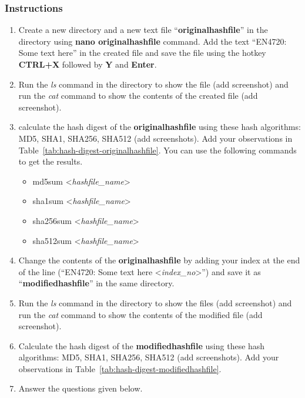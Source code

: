 \documentclass[11pt,letterpaper]{article}
\begin{document}
	\subsubsection*{Instructions}
	\begin{enumerate}
		\item Create a new directory and a new text file ``\textbf{originalhashfile}'' in the directory using \textbf{nano originalhashfile} command. Add the text ``EN4720: Some text here'' in the created file and save the file using the hotkey \textbf{CTRL+X} followed by \textbf{Y} and \textbf{Enter}.
		
		\item Run the \textit{ls} command in the directory to show the file (add screenshot) and run the \textit{cat} command to show the contents of the created file (add screenshot).
		
		\item calculate the hash digest of the \textbf{originalhashfile} using these hash algorithms: MD5, SHA1, SHA256, SHA512 (add screenshots). Add your observations in Table~\ref{tab:hash-digest-originalhashfile}. You can use the following commands to get the results.
		\begin{itemize}
			\item md5sum \textless \textit{hashfile\_name}\textgreater
			\item sha1sum \textless \textit{hashfile\_name}\textgreater
			\item sha256sum \textless \textit{hashfile\_name}\textgreater
			\item sha512sum \textless \textit{hashfile\_name}\textgreater
		\end{itemize}
		
		\item Change the contents of the \textbf{originalhashfile} by adding your index at the end of the line (``EN4720: Some text here \textless\textit{index\_no}\textgreater'') and save it as ``\textbf{modifiedhashfile}'' in the same directory.
		
		\item Run the \textit{ls} command in the directory to show the files (add screenshot) and run the \textit{cat} command to show the contents of the modified file (add screenshot).
		
		\item Calculate the hash digest of the \textbf{modifiedhashfile} using these hash algorithms: MD5, SHA1, SHA256, SHA512 (add screenshots). Add your observations in Table~\ref{tab:hash-digest-modifiedhashfile}.
		
		\item Answer the questions given below.
		
	\end{enumerate}
	
\end{document}
